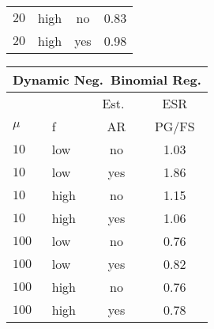 \documentclass[12pt]{article}
\begin{document}
\begin{table}
\begin{center}
\begin{tabular}{l l c c}
      $20$ & high & no & 0.83 \\
      $20$ & high & yes & 0.98
    \end{tabular}
    \hspace{12pt}
    \begin{tabular}{l l c c}
      \multicolumn{4}{c}{Dynamic Neg.\ Binomial Reg.} \\
      \hline
      & & Est.\ & ESR \\
      $\mu$ & f & AR & PG/FS \\
      \hline
      $10$ & low & no & 1.03 \\
      $10$ & low & yes & 1.86 \\

      $10$ & high & no & 1.15 \\
      $10$ & high & yes & 1.06 \\

      $100$ & low & no & 0.76 \\
      $100$ & low & yes & 0.82 \\

      $100$ & high & no & 0.76 \\
      $100$ & high & yes & 0.78 \\


\end{tabular}
\end{center}
\end{table}
\end{document}
